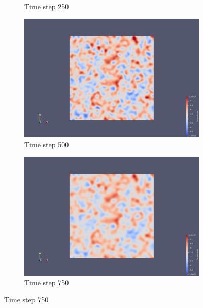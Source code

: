 \documentclass[a4paper,12pt]{article}
\begin{document}
\begin{figure}
\begin{subfigure}{0.4\textwidth}
    \caption{Time step 250}
\end{subfigure}
\hfill
\begin{subfigure}{0.4\textwidth}
    \includegraphics[width=\textwidth]{../images/vtk/bonus/temp/step_50.png}
    \caption{Time step 500}
\end{subfigure}
\hfill
\begin{subfigure}{0.4\textwidth}
    \includegraphics[width=\textwidth]{../images/vtk/bonus/temp/step_75.png}
    \caption{Time step 750}
\end{subfigure}


\end{figure}
\end{document}
